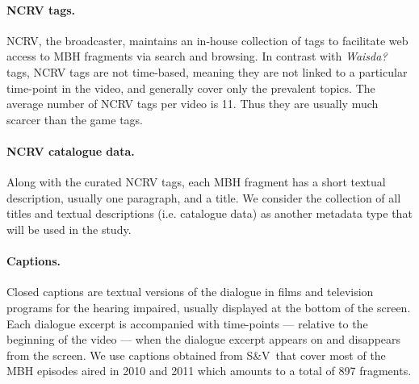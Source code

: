 \paragraph{\textbf{NCRV tags.}} NCRV, the broadcaster, maintains an in-house collection of tags %
to facilitate web access to MBH fragments via search and browsing. In contrast with \textit{Waisda?} tags, NCRV tags are not time-based, meaning they are not linked to a particular time-point in the video, and generally cover only the prevalent topics. The average number of NCRV tags per video is 11. Thus they are usually much scarcer than the game tags.
\paragraph{\textbf{NCRV catalogue data}.} Along with the curated NCRV tags, each MBH fragment has a short textual description, usually one paragraph, and a title. We consider the collection of all titles and textual descriptions (i.e. catalogue data) as another metadata type that will be used in the study.
\paragraph{\textbf{Captions}.} %
Closed captions are textual versions of the dialogue in films and television programs for the hearing impaired, usually displayed at the bottom of the screen. Each dialogue excerpt is accompanied with time-points --- relative to the beginning of the video --- when the dialogue excerpt appears on and disappears from the screen. We use captions  obtained from S\&V\ that cover most of the MBH episodes aired in 2010 and 2011 which amounts to a total of 897 fragments. 

